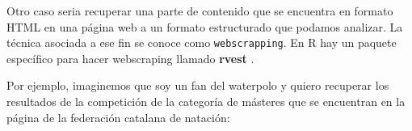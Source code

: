 \documentclass[]{book}
\newenvironment{Shaded}{\begin{snugshade}}{\end{snugshade}}
\newcommand{\CommentTok}[1]{\textcolor[rgb]{0.56,0.35,0.01}{\textit{#1}}}
\newcommand{\DecValTok}[1]{\textcolor[rgb]{0.00,0.00,0.81}{#1}}
\newcommand{\KeywordTok}[1]{\textcolor[rgb]{0.13,0.29,0.53}{\textbf{#1}}}
\newcommand{\NormalTok}[1]{#1}
\newcommand{\OperatorTok}[1]{\textcolor[rgb]{0.81,0.36,0.00}{\textbf{#1}}}
\newcommand{\StringTok}[1]{\textcolor[rgb]{0.31,0.60,0.02}{#1}}
\theoremstyle{definition}
\theoremstyle{definition}
\theoremstyle{definition}
\theoremstyle{remark}
\begin{document}
Otro caso seria recuperar una parte de contenido que se encuentra en
formato HTML en una página web a un formato estructurado que podamos
analizar. La técnica asociada a ese fin se conoce como
\texttt{webscrapping}. En R hay un paquete específico para hacer
webscraping llamado \textbf{rvest} \citep{R-rvest}.

Por ejemplo, imaginemos que soy un fan del waterpolo y quiero recuperar
los resultados de la competición de la categoría de másteres que se
encuentran en la página de la federación catalana de natación:

\begin{Shaded}
\end{Shaded}
\end{document}
